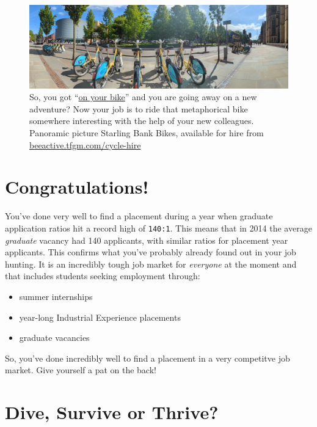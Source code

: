 \documentclass[
]{book}
\providecommand{\tightlist}{%
  \setlength{\itemsep}{0pt}\setlength{\parskip}{0pt}}
\begin{document}
\begin{figure}

{\centering \includegraphics[width=1\linewidth]{images/onyerbike} 

}

\caption{So, you got ``\href{https://en.wiktionary.org/wiki/on_your_bike}{on your bike}'' \citep{tebbit} and you are going away on a new adventure? Now your job is to ride that metaphorical bike somewhere interesting with the help of your new colleagues. Panoramic picture Starling Bank Bikes, available for hire from \href{https://beeactive.tfgm.com/cycle-hire/}{beeactive.tfgm.com/cycle-hire}}\label{fig:onyerbike-fig}
\end{figure}



\section{Congratulations!}\label{congrats}

You've done very well to find a placement during a year when graduate application ratios hit a record high of \texttt{140:1}. This means that in 2014 the average \emph{graduate} vacancy had 140 applicants, with similar ratios for placement year applicants. \citep{ratio} This confirms what you've probably already found out in your job hunting. It is an incredibly tough job market for \emph{everyone} at the moment and that includes students seeking employment through:

\begin{itemize}
\tightlist
\item
  summer internships
\item
  year-long Industrial Experience placements
\item
  graduate vacancies
\end{itemize}

So, you've done incredibly well to find a placement in a very competitve job market. Give yourself a pat on the back!

\section{Dive, Survive or Thrive?}\label{thrive}
\end{document}
